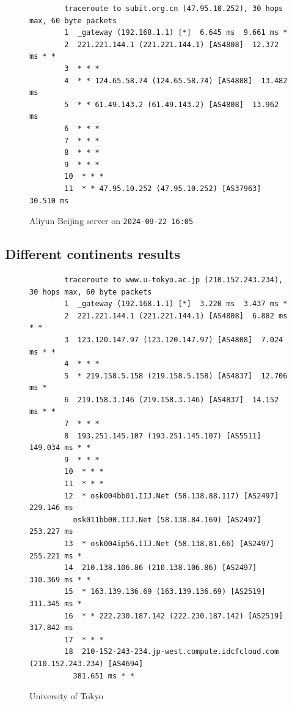 \documentclass{cshwk}
\begin{document}
\begin{figure}[H]
    \footnotesize
    \begin{verbatim}
        traceroute to subit.org.cn (47.95.10.252), 30 hops max, 60 byte packets
        1  _gateway (192.168.1.1) [*]  6.645 ms  9.661 ms *
        2  221.221.144.1 (221.221.144.1) [AS4808]  12.372 ms * *
        3  * * *
        4  * * 124.65.58.74 (124.65.58.74) [AS4808]  13.482 ms
        5  * * 61.49.143.2 (61.49.143.2) [AS4808]  13.962 ms
        6  * * *
        7  * * *
        8  * * *
        9  * * *
        10  * * *
        11  * * 47.95.10.252 (47.95.10.252) [AS37963]  30.510 ms
    \end{verbatim}
    \caption{Aliyun Beijing server on \texttt{2024-09-22 16:05}}
    \label{fig:traceroute6}
\end{figure}

\subsection{Different continents results}

\begin{figure}[H]
    \footnotesize
    \begin{verbatim}
        traceroute to www.u-tokyo.ac.jp (210.152.243.234), 30 hops max, 60 byte packets
        1  _gateway (192.168.1.1) [*]  3.220 ms  3.437 ms *
        2  221.221.144.1 (221.221.144.1) [AS4808]  6.882 ms * *
        3  123.120.147.97 (123.120.147.97) [AS4808]  7.024 ms * *
        4  * * *
        5  * 219.158.5.158 (219.158.5.158) [AS4837]  12.706 ms *
        6  219.158.3.146 (219.158.3.146) [AS4837]  14.152 ms * *
        7  * * *
        8  193.251.145.107 (193.251.145.107) [AS5511]  149.034 ms * *
        9  * * *
        10  * * *
        11  * * *
        12  * osk004bb01.IIJ.Net (58.138.88.117) [AS2497]  229.146 ms 
          osk011bb00.IIJ.Net (58.138.84.169) [AS2497]  253.227 ms
        13  * osk004ip56.IIJ.Net (58.138.81.66) [AS2497]  255.221 ms *
        14  210.138.106.86 (210.138.106.86) [AS2497]  310.369 ms * *
        15  * 163.139.136.69 (163.139.136.69) [AS2519]  311.345 ms *
        16  * * 222.230.187.142 (222.230.187.142) [AS2519]  317.842 ms
        17  * * *
        18  210-152-243-234.jp-west.compute.idcfcloud.com (210.152.243.234) [AS4694]  
          381.651 ms * *
    \end{verbatim}
    \caption{University of Tokyo}
    \label{fig:traceroute-utokyo}
\end{figure}
\end{document}
